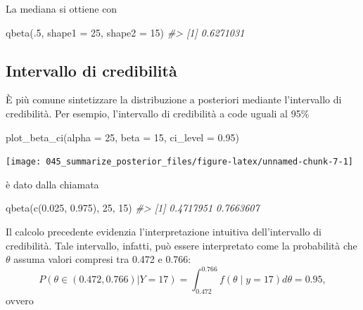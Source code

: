 \documentclass[
  11pt,
  italian,
  a4paper,
  extrafontsizes,onecolumn,openright
  ]{memoir}
\newenvironment{Shaded}{\begin{snugshade}}{\end{snugshade}}
\newcommand{\AttributeTok}[1]{\textcolor[rgb]{0.77,0.63,0.00}{#1}}
\newcommand{\CommentTok}[1]{\textcolor[rgb]{0.56,0.35,0.01}{\textit{#1}}}
\newcommand{\DecValTok}[1]{\textcolor[rgb]{0.00,0.00,0.81}{#1}}
\newcommand{\FloatTok}[1]{\textcolor[rgb]{0.00,0.00,0.81}{#1}}
\newcommand{\FunctionTok}[1]{\textcolor[rgb]{0.00,0.00,0.00}{#1}}
\newcommand{\NormalTok}[1]{#1}
\begin{document}
La mediana si ottiene con

\begin{Shaded}
\begin{Highlighting}[]
\FunctionTok{qbeta}\NormalTok{(.}\DecValTok{5}\NormalTok{, }\AttributeTok{shape1 =} \DecValTok{25}\NormalTok{, }\AttributeTok{shape2 =} \DecValTok{15}\NormalTok{)}
\CommentTok{\#\textgreater{} [1] 0.6271031}
\end{Highlighting}
\end{Shaded}

\hypertarget{intervallo-di-credibilituxe0-1}{%
\subsection{Intervallo di credibilità}\label{intervallo-di-credibilituxe0-1}}

È più comune sintetizzare la distribuzione a posteriori mediante l'intervallo di credibilità. Per esempio, l'intervallo di credibilità a code uguali al 95\%

\begin{Shaded}
\begin{Highlighting}[]
\FunctionTok{plot\_beta\_ci}\NormalTok{(}\AttributeTok{alpha =} \DecValTok{25}\NormalTok{, }\AttributeTok{beta =} \DecValTok{15}\NormalTok{, }\AttributeTok{ci\_level =} \FloatTok{0.95}\NormalTok{)}
\end{Highlighting}
\end{Shaded}

\begin{center}\texttt{[image: 045\_summarize\_posterior\_files/figure-latex/unnamed-chunk-7-1]} \end{center}

\noindent
è dato dalla chiamata

\begin{Shaded}
\begin{Highlighting}[]
\FunctionTok{qbeta}\NormalTok{(}\FunctionTok{c}\NormalTok{(}\FloatTok{0.025}\NormalTok{, }\FloatTok{0.975}\NormalTok{), }\DecValTok{25}\NormalTok{, }\DecValTok{15}\NormalTok{)}
\CommentTok{\#\textgreater{} [1] 0.4717951 0.7663607}
\end{Highlighting}
\end{Shaded}

\noindent
Il calcolo precedente evidenzia l'interpretazione intuitiva dell'intervallo di credibilità. Tale intervallo, infatti, può essere interpretato come la probabilità che \(\theta\) assuma valori compresi tra 0.472 e 0.766:
\[
P(\theta \in (0.472, 0.766) | Y = 17) = \int_{0.472}^{0.766} f(\theta \mid y=17) d\theta = 0.95,
\]
ovvero
\end{document}
